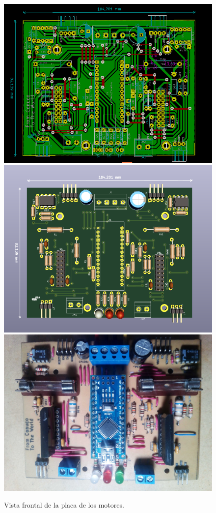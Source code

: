 \begin{figure}[H]
	\centering	
	\includegraphics[width=0.7\linewidth]{imagenes/prototipo/Placa/PCB_FrontAllLayers}	\includegraphics[width=0.7\linewidth]{imagenes/prototipo/Placa/3dViewerFront}
	\includegraphics[width=0.7\linewidth]{imagenes/prototipo/Placa/PCB_FinalFront}
	\caption[Vista frontal de la placa de los motores]{Vista frontal de la placa de los motores.}
	\label{imagen:PlacaMotoresFrontal}
\end{figure}

